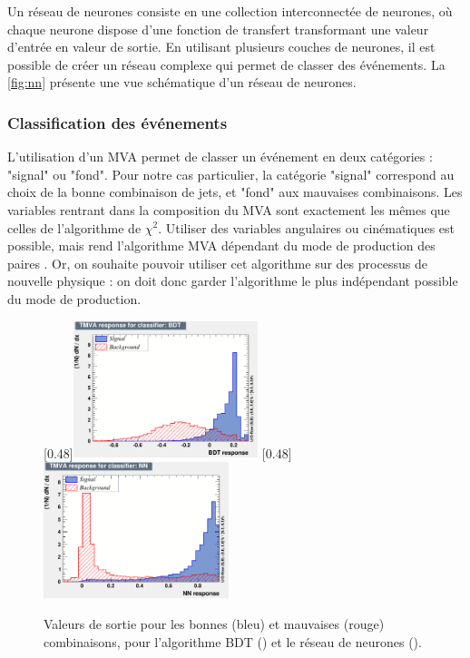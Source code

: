 Un réseau de neurones consiste en une collection interconnectée de neurones, où chaque neurone dispose d'une fonction de transfert transformant une valeur d'entrée en valeur de sortie. En utilisant plusieurs couches de neurones, il est possible de créer un réseau complexe qui permet de classer des événements. La \cref{fig:nn} présente une vue schématique d'un réseau de neurones.

\subsubsection{Classification des événements \ttbar}

L'utilisation d'un MVA permet de classer un événement en deux catégories : "signal" ou "fond". Pour notre cas particulier, la catégorie "signal" correspond au choix de la bonne combinaison de jets, et "fond" aux mauvaises combinaisons. Les variables rentrant dans la composition du MVA sont exactement les mêmes que celles de l'algorithme de $\chi^2$. Utiliser des variables angulaires ou cinématiques est possible, mais rend l'algorithme MVA dépendant du mode de production des paires \ttbar. Or, on souhaite pouvoir utiliser cet algorithme sur des processus de nouvelle physique : on doit donc garder l'algorithme le plus indépendant possible du mode de production.

\bigskip

\begin{figure}[tbp] \centering
    \subcaptionbox{\label{fig:mva_bdt_discr}}[0.48\textwidth]{\includegraphics[width=0.48\textwidth]{chapitre6/figs/mva/mva_BDT.pdf}}
    \subcaptionbox{\label{fig:mva_nn_discr}}[0.48\textwidth]{\includegraphics[width=0.48\textwidth]{chapitre6/figs/mva/mva_NN.pdf}}
    \caption{Valeurs de sortie pour les bonnes (bleu) et mauvaises (rouge) combinaisons, pour l'algorithme BDT () et le réseau de neurones ().}
\end{figure}

